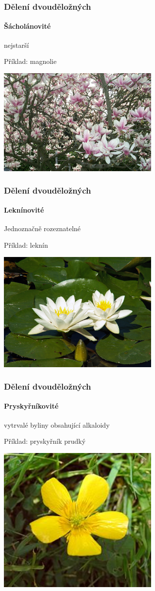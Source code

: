 \documentclass{beamer}
\begin{document}
\begin{frame}


\frametitle{Dělení dvouděložných}
	\framesubtitle{Šácholánovité}nejstarší

Příklad: magnolie

\begin{center}\includegraphics[width=8cm]{Magnolie_in_Wehrheim_-_April_2006.jpg}\end{center}
\end{frame}
\begin{frame}
\frametitle{Dělení dvouděložných}
	\framesubtitle{Leknínovité}Jednoznačně rozeznatelné

Příklad: leknín

\begin{center}\includegraphics[width=8cm]{Nymphaea_alba_26-8-2007_15-13-19.jpg}\end{center}
\end{frame}
\begin{frame}
\frametitle{Dělení dvouděložných}
	\framesubtitle{Pryskyřníkovité}vytrvalé byliny obsahující alkaloidy

Příklad: pryskyřník prudký

\begin{center}\includegraphics[width=8cm]{220px-A_06_butterblume_2_wp.jpg}\end{center}
\end{frame}
\end{document}
